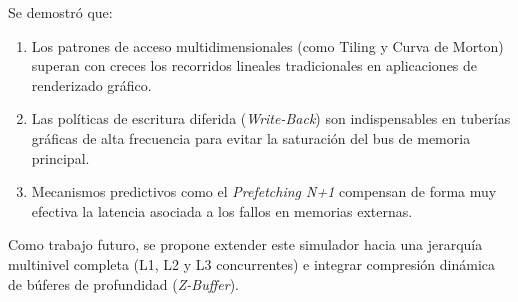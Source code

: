 \documentclass[12pt,letterpaper]{article}
\begin{document}
Se demostró que:
\begin{enumerate}
    \item Los patrones de acceso multidimensionales (como Tiling y Curva de Morton) superan con creces los recorridos lineales tradicionales en aplicaciones de renderizado gráfico.
    \item Las políticas de escritura diferida (\textit{Write-Back}) son indispensables en tuberías gráficas de alta frecuencia para evitar la saturación del bus de memoria principal.
    \item Mecanismos predictivos como el \textit{Prefetching N+1} compensan de forma muy efectiva la latencia asociada a los fallos en memorias externas.
\end{enumerate}

Como trabajo futuro, se propone extender este simulador hacia una jerarquía multinivel completa (L1, L2 y L3 concurrentes) e integrar compresión dinámica de búferes de profundidad (\textit{Z-Buffer}).
\end{document}
